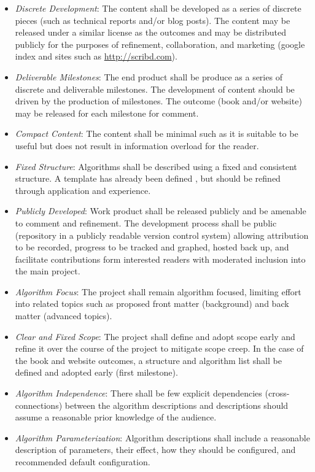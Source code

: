 \documentclass[a4paper, 11pt]{article}
\begin{document}
\begin{itemize}
	\item \emph{Discrete Development}: The content shall be developed as a series of discrete pieces (such as technical reports and/or blog posts). The content may be released under a similar license as the outcomes and may be distributed publicly for the purposes of refinement, collaboration, and marketing (google index and sites such as \url{http://scribd.com}). 
	\item \emph{Deliverable Milestones}: The end product shall be produce as a series of discrete and deliverable milestones. The development of content should be driven by the production of milestones. The outcome (book and/or website) may be released for each milestone for comment.
	\item \emph{Compact Content}: The content shall be minimal such as it is suitable to be useful but does not result in information overload for the reader.
	\item \emph{Fixed Structure}: Algorithms shall be described using a fixed and consistent structure. A template has already been defined \cite{Brownlee2010a}, but should be refined through application and experience. 
	\item \emph{Publicly Developed}: Work product shall be released publicly and be amenable to comment and refinement. The development process shall be public (repository in a publicly readable version control system) allowing attribution to be recorded, progress to be tracked and graphed, hosted back up, and facilitate contributions form interested readers with moderated inclusion into the main project.
	\item \emph{Algorithm Focus}: The project shall remain algorithm focused, limiting effort into related topics such as proposed front matter (background) and back matter (advanced topics).
	\item \emph{Clear and Fixed Scope}: The project shall define and adopt scope early and refine it over the course of the project to mitigate scope creep. In the case of the book and website outcomes, a structure and algorithm list shall be defined and adopted early (first milestone).
	\item \emph{Algorithm Independence}: There shall be few explicit dependencies (cross-connections) between the algorithm descriptions and descriptions should assume a reasonable prior knowledge of the audience. 
	\item \emph{Algorithm Parameterization}: Algorithm descriptions shall include a reasonable description of parameters, their effect, how they should be configured, and recommended default configuration.
\end{itemize}
\end{document}
